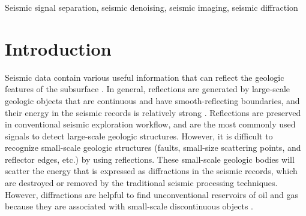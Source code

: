 \documentclass[10pt]{IEEEtran}
\begin{document}
\begin{keywords}
Seismic signal separation, seismic denoising, seismic imaging, seismic diffraction
\end{keywords}

\section{Introduction}
Seismic data contain various useful information that can reflect the geologic features of the subsurface \cite{shucai2020,guoyin2018}. In general, reflections are generated by large-scale geologic objects that are continuous and have smooth-reflecting boundaries, and their energy in the seismic records is relatively strong \cite{2010Imaging, Peng2018Accurate}. 
Reflections are preserved in conventional seismic exploration workflow, and are the most commonly used signals to detect large-scale geologic structures. 
However, it is difficult to recognize small-scale geologic structures  (faults, small-size scattering points, and reflector edges, etc.) by using reflections. 
These small-scale geologic bodies will scatter the energy that is expressed as diffractions in the seismic records, which are destroyed or removed by the traditional seismic processing techniques.
However, diffractions are helpful to find unconventional reservoirs of oil and gas because they are associated with small-scale discontinuous objects \cite{2016Diffraction, 2020Separation}.
\end{document}

